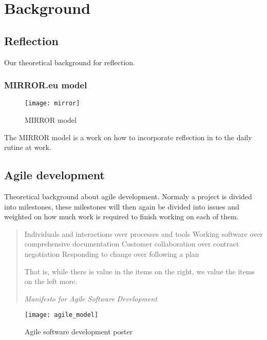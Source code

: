 \chapter{Background}

\section{Reflection}
Our theoretical background for reflection.
\subsection{MIRROR.eu model}

\begin{figure}[h!]
\label{logo}
\centering
	\texttt{[image: mirror]}
\caption{MIRROR model}
\end{figure}
The MIRROR model is a work on how to incorporate reflection in to the daily rutine at work.


\section{Agile development}
Theoretical background about agile development. Normaly a project is divided into milestones, these milestones will then again be divided into issues and weighted on how much work is required to finish working on each of them.

\begin{quotation}
Individuals and interactions over processes and tools
Working software over comprehensive documentation
Customer collaboration over contract negotiation
Responding to change over following a plan

That is, while there is value in the items on
the right, we value the items on the left more.

\em Manifesto for Agile Software Development
\end{quotation}

\begin{figure}[h!]
\label{logo}
\centering
	\texttt{[image: agile\_model]}
\caption{Agile software development poster}
\end{figure}

